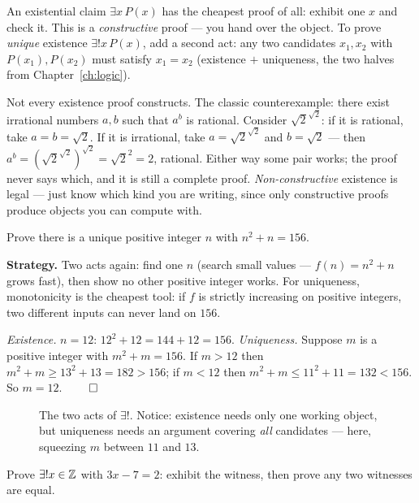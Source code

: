 An existential claim $\exists x\,P(x)$ has the cheapest proof of all: exhibit
one $x$ and check it. This is a \emph{constructive}
proof --- you hand over the object. To prove \emph{unique} existence
$\exists!x\,P(x)$, add a second act: any two candidates $x_1, x_2$ with
$P(x_1), P(x_2)$ must satisfy $x_1 = x_2$ (existence $+$ uniqueness, the two
halves from Chapter~\ref{ch:logic}).

Not every existence proof constructs. The classic counterexample: there exist
irrational numbers $a, b$ such that $a^b$ is rational. Consider
$\sqrt{2}^{\sqrt{2}}$: if it is rational, take $a = b = \sqrt{2}$. If it is
irrational, take $a = \sqrt{2}^{\sqrt{2}}$ and $b = \sqrt{2}$ --- then
$a^b = (\sqrt{2}^{\sqrt{2}})^{\sqrt{2}} = \sqrt{2}^2 = 2$, rational. Either way
some pair works; the proof never says which, and it is still a complete proof.
\emph{Non-constructive} existence is legal ---
just know which kind you are writing, since only constructive proofs produce
objects you can compute with.

\begin{example}\label{ex:unique156}
Prove there is a unique positive integer $n$ with $n^2 + n = 156$.
\par\smallskip
\textbf{Strategy.} Two acts again: find one $n$ (search small values ---
$f(n) = n^2+n$ grows fast), then show no other positive integer works. For
uniqueness, monotonicity is the cheapest tool: if $f$ is strictly increasing
on positive integers, two different inputs can never land on $156$.
\par\smallskip
\begin{solution}
\emph{Existence.} $n = 12$: $12^2 + 12 = 144 + 12 = 156$.
\emph{Uniqueness.} Suppose $m$ is a positive integer with $m^2 + m = 156$.
If $m > 12$ then $m^2 + m \ge 13^2 + 13 = 182 > 156$; if $m < 12$ then
$m^2 + m \le 11^2 + 11 = 132 < 156$. So $m = 12$. $\qed$
\end{solution}
\end{example}

\begin{figure}[ht]\centering

\caption{The two acts of $\exists!$. Notice: existence needs only one working
object, but uniqueness needs an argument covering \emph{all} candidates ---
here, squeezing $m$ between $11$ and $13$.}
\label{fig:uniq}
\end{figure}

\begin{exercise}[easy]\label{exr:witness}
Prove $\exists!x \in \mathbb{Z}$ with $3x - 7 = 2$: exhibit the witness, then prove any
two witnesses are equal.
\end{exercise}


